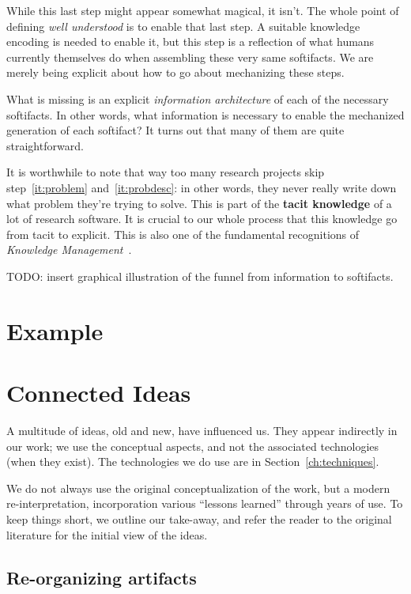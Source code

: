 \documentclass[10pt,twoside,onecolumn,openany,letterpaper]{memoir}
\begin{document}
While this last step might appear somewhat magical, it isn't. The whole
point of defining \emph{well understood} is to enable that last step. A
suitable knowledge encoding is needed to enable it, but this step is a
reflection of what humans currently themselves do when assembling these very
same softifacts. We are merely being explicit about how to go about
mechanizing these steps.

What is missing is an explicit \emph{information architecture} of each of
the necessary softifacts. In other words, what information is necessary to
enable the mechanized generation of each softifact? It turns out that many
of them are quite straightforward.

It is worthwhile to note that way too many research projects skip
step~\ref{it:problem} and~\ref{it:probdesc}: in other words, they never really
write down what problem they're trying to solve. This is part of the
\textbf{tacit knowledge} of a lot of research software.  It is crucial to our
whole process that this knowledge go from tacit to explicit. This is also one
of the fundamental recognitions of \emph{Knowledge
Management}~\cite{KM-textbook}.

TODO: insert graphical illustration of the funnel from information to
softifacts.

\chapter{Example}\label{ch:example}

\chapter{Connected Ideas}\label{ch:ideas}

A multitude of ideas, old and new, have influenced us. They appear
indirectly in our work; we use the conceptual aspects, and not the
associated technologies (when they exist). The technologies we do use
are in Section~\ref{ch:techniques}.

We do not always use the original conceptualization of the work, but
a modern re-interpretation, incorporation various ``lessons learned''
through years of use. To keep things short, we outline our take-away, and refer
the reader to the original literature for the initial view of the ideas.

\section{Re-organizing artifacts}
\end{document}
